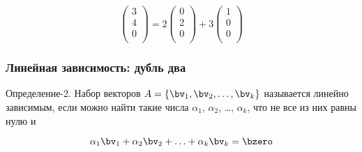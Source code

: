 \begin{frame}
\begin{itemize}[<+->]
    \[
      \begin{pmatrix}
        3 \\
        4 \\
        0 \\
      \end{pmatrix} = 2
    \begin{pmatrix}
      0 \\
      2 \\
      0 \\
    \end{pmatrix} + 3
    \begin{pmatrix}
      1 \\
      0 \\
      0 \\
    \end{pmatrix}  
    \]


  \end{itemize}
  

\end{frame}


\begin{frame}
  \frametitle{Линейная зависимость: дубль два}

  Определение-2. Набор векторов $A = \{ \bv_1, \bv_2, \ldots, \bv_k\}$ называется \alert{линейно зависимым},
  если можно найти такие числа $\alpha_1$, $\alpha_2$, \ldots, $\alpha_k$, что
  не все из них равны нулю и 

  \[
  \alpha_1 \bv_1 + \alpha_2 \bv_2 + \ldots + \alpha_k \bv_k = \bzero  
  \]

  
\end{frame}